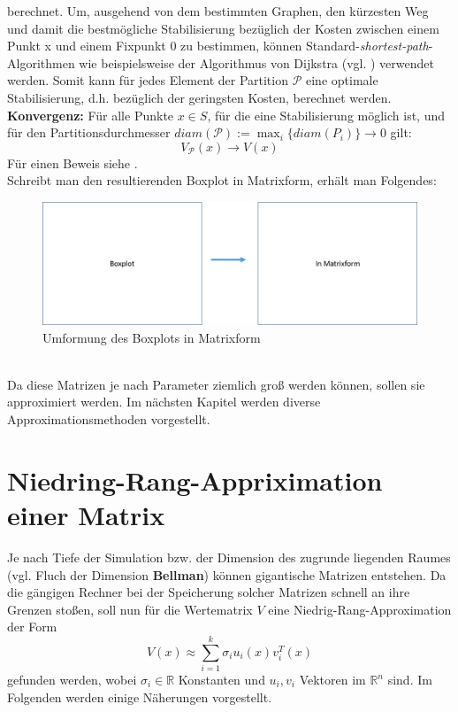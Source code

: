 \documentclass[12pt,a4paper,twoside]{article}
\begin{document}
	berechnet. \newline
	\newline
	Um, ausgehend von dem bestimmten Graphen, den kürzesten Weg und damit die bestmögliche Stabilisierung bezüglich 
	der Kosten zwischen einem Punkt x und einem Fixpunkt $0$ zu bestimmen, können Standard-\textit{shortest-path}-Algorithmen wie beispielsweise der Algorithmus von Dijkstra (vgl. \citep{Dijkstra59}) verwendet werden.
	\newline
	Somit kann für jedes Element der Partition $\mathcal{P}$ eine optimale Stabilisierung, d.h. bezüglich der geringsten Kosten, berechnet werden. \newline
	\newline
	\textbf{Konvergenz:} Für alle Punkte $x\in S$, für die eine Stabilisierung möglich ist, und für den Partitionsdurchmesser $diam(\mathcal{P}):=\max_i\{diam(P_i)\}\rightarrow 0$ gilt:
	\begin{equation*}
		V_\mathcal{P}(x)\rightarrow V(x)
	\end{equation*}
	Für einen Beweis siehe \cite{Junge2004}. \\
	Schreibt man den resultierenden Boxplot in Matrixform, erhält man Folgendes: \\
	\begin{figure}[h]
		\includegraphics[scale=0.5]{testbild}
		\caption{Umformung des Boxplots in Matrixform}
	\end{figure}
	\\
Da diese Matrizen je nach Parameter ziemlich groß werden können, sollen sie approximiert werden. Im nächsten Kapitel werden diverse Approximationsmethoden vorgestellt.
\section{Niedring-Rang-Appriximation einer Matrix}
	Je nach Tiefe der Simulation bzw. der Dimension des zugrunde liegenden Raumes (vgl. Fluch der Dimension \textbf{Bellman}) können gigantische Matrizen entstehen. Da die gängigen Rechner bei der Speicherung solcher Matrizen schnell an ihre Grenzen stoßen, soll nun für die Wertematrix $V$ eine Niedrig-Rang-Approximation der Form
	\begin{equation}
		\label{eq:approx}
		V(x)\approx \sum_{i=1}^k\sigma_i u_i(x) v_i^T(x)
	\end{equation}
	gefunden werden, wobei $\sigma_i\in \mathds{R}$ Konstanten und $u_i, v_i$ Vektoren im $\mathds{R}^n$ sind. Im Folgenden werden einige Näherungen vorgestellt.
\end{document}

